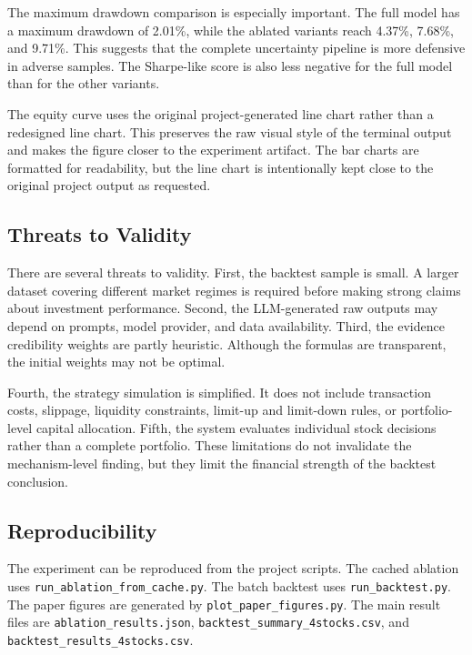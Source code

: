 \documentclass[14pt,a4paper]{extarticle}
\begin{document}
The maximum drawdown comparison is especially important. The full model has a maximum drawdown of 2.01\%, while the ablated variants reach 4.37\%, 7.68\%, and 9.71\%. This suggests that the complete uncertainty pipeline is more defensive in adverse samples. The Sharpe-like score is also less negative for the full model than for the other variants.

The equity curve uses the original project-generated line chart rather than a redesigned line chart. This preserves the raw visual style of the terminal output and makes the figure closer to the experiment artifact. The bar charts are formatted for readability, but the line chart is intentionally kept close to the original project output as requested.

\subsection{Threats to Validity}

There are several threats to validity. First, the backtest sample is small. A larger dataset covering different market regimes is required before making strong claims about investment performance. Second, the LLM-generated raw outputs may depend on prompts, model provider, and data availability. Third, the evidence credibility weights are partly heuristic. Although the formulas are transparent, the initial weights may not be optimal.

Fourth, the strategy simulation is simplified. It does not include transaction costs, slippage, liquidity constraints, limit-up and limit-down rules, or portfolio-level capital allocation. Fifth, the system evaluates individual stock decisions rather than a complete portfolio. These limitations do not invalidate the mechanism-level finding, but they limit the financial strength of the backtest conclusion.

\subsection{Reproducibility}

The experiment can be reproduced from the project scripts. The cached ablation uses \texttt{run\_ablation\_from\_cache.py}. The batch backtest uses \texttt{run\_backtest.py}. The paper figures are generated by \texttt{plot\_paper\_figures.py}. The main result files are \texttt{ablation\_results.json}, \texttt{backtest\_summary\_4stocks.csv}, and \texttt{backtest\_results\_4stocks.csv}.
\end{document}
